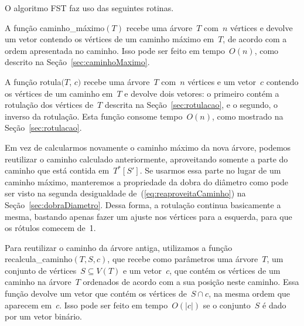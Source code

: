 		O algoritmo FST faz uso das seguintes rotinas.

		A função {\sc caminho\_máximo}$(T)$ 
		recebe uma árvore~$T$ com~$n$ vértices e
		devolve um vetor contendo os vértices de um caminho 
		máximo em~$T$, de acordo com a ordem apresentada no caminho.
		Isso pode ser feito em tempo~$O(n)$, como descrito na 
		Seção~\ref{sec:caminhoMaximo}.

		A função {\sc rotula}$(T$, $c)$ recebe uma árvore~$T$ com~$n$ vértices 
		e um vetor~$c$
		contendo os vértices de um caminho em~$T$ e
		devolve dois vetores: o primeiro contém a rotulação dos vértices 
		de~$T$
		descrita na Seção~\ref{sec:rotulacao}, e o segundo, o inverso
		da rotulação. 
		Esta função consome tempo~$O(n)$, como mostrado na 
		Seção~\ref{sec:rotulacao}.

		Em vez de calcularmos novamente o caminho máximo da nova
		árvore, podemos reutilizar o caminho calculado anteriormente,
		aproveitando somente a parte do caminho que está contida 
		em~$T^*[S']$. 
		Se usarmos essa parte no lugar de um caminho máximo,
		manteremos a propriedade da dobra do diâmetro como pode
		ser visto na segunda desigualdade de~(\ref{eq:reaproveitaCaminho}) na 
		Seção~\ref{sec:dobraDiametro}. 
		Dessa forma, a rotulação continua basicamente a mesma,
		bastando apenas fazer um ajuste nos vértices para a esquerda,
		para que os rótulos comecem de~1.
		
		Para reutilizar o caminho da árvore antiga, utilizamos a 
		função {\sc recalcula\_caminho}$(T,S,c)$, que
		recebe como parâmetros uma árvore~$T$, um conjunto de vértices~$S\subseteq V(T)$ 
		e um vetor~$c$, que contém os vértices de um caminho na árvore~$T$ ordenados
		de acordo com a sua posição neste caminho.
		Essa função devolve um vetor que contém os vértices de~$S\cap c$, na mesma 
		ordem que aparecem em~$c$. 
		Isso pode ser feito em tempo~$O(|c|)$ se 
		o conjunto~$S$ é dado por um vetor binário.


